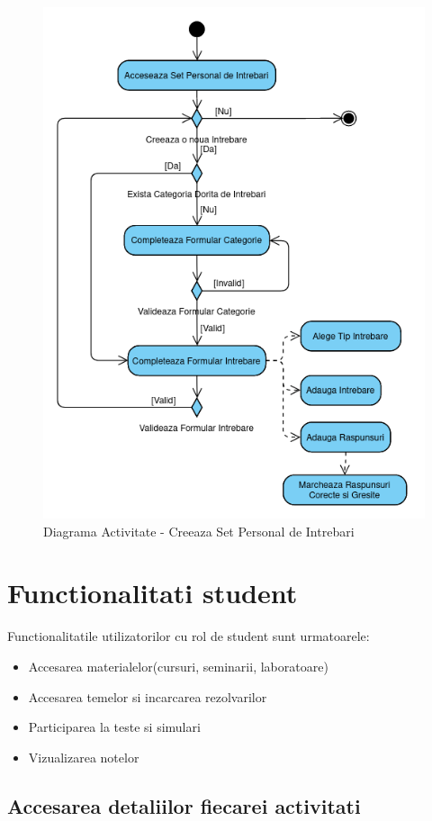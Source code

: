 \documentclass[12pt, a4paper, oneside, romanian]{teza-upb}
\begin{document}
\begin{figure}[H]
\centering
\includegraphics*[width=0.75\columnwidth]{diagrama-activitate-creeaza-set-personal-de-intrebari}
\caption{Diagrama Activitate - Creeaza Set Personal de Intrebari}
\label{diagrama-activitate-creeaza-set-personal-de-intrebari}
\end{figure}

\section{Functionalitati student}

Functionalitatile utilizatorilor cu rol de student sunt urmatoarele:
\begin{itemize}
	\item Accesarea materialelor(cursuri, seminarii, laboratoare)
	\item Accesarea temelor si incarcarea rezolvarilor
	\item Participarea la teste si simulari
	\item Vizualizarea notelor
\end{itemize}

\subsection{Accesarea detaliilor fiecarei activitati}
\end{document}
